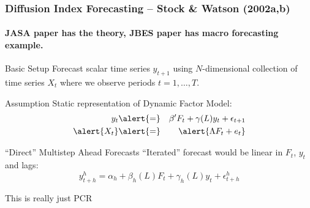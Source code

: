 \documentclass[handout]{beamer}
\begin{document}
\begin{frame}[c]\frametitle{Diffusion Index Forecasting -- Stock \& Watson (2002a,b)}
 \framesubtitle{JASA paper has the theory, JBES paper has macro forecasting example.}

\begin{block}
	{Basic Setup}
	Forecast scalar time series $y_{t+1}$ using $N$-dimensional collection of time series $X_t$ where we observe periods $t = 1, \hdots, T$.
\end{block}

\begin{block}
	{Assumption}
	Static representation of Dynamic Factor Model:
	\begin{eqnarray*}
		y_{t}&\alert{=}& \beta' F_t + \gamma(L)y_t + \epsilon_{t+1}\\
		\alert{X_t} &\alert{=}& \alert{\Lambda F_t + e_t}
	\end{eqnarray*}
\end{block}

\begin{block}
	{``Direct'' Multistep Ahead Forecasts}
	``Iterated'' forecast would be linear in $F_t$, $y_t$ and lags:
	$$y_{t+h}^h = \alpha_h + \beta_h(L)F_t +  \gamma_h(L)y_t + \epsilon^h_{t+h}$$
\end{block}
\end{frame}

\begin{frame}
\begin{center}
	\Huge This is really just PCR
\end{center}
\end{frame}
\end{document}
